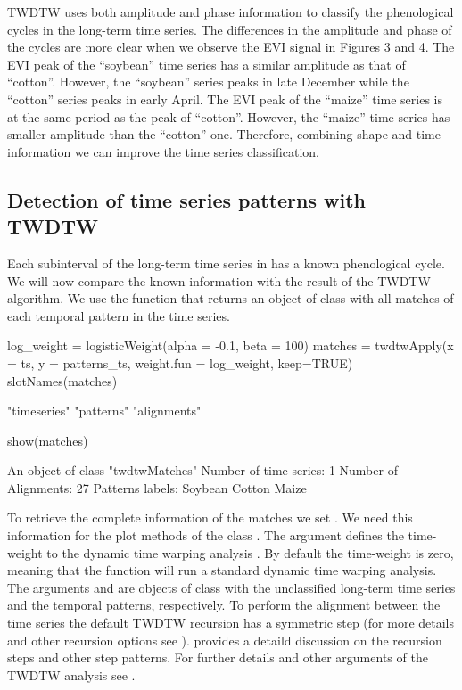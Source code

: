 \documentclass[article,shortnames]{jss}
\begin{document}
TWDTW uses both amplitude and phase information to classify the
phenological cycles in the long-term time series. The differences in the
amplitude and phase of the cycles are more clear when we observe the EVI
signal in Figures 3 and 4. The EVI peak of the ``soybean'' time series
has a similar amplitude as that of ``cotton''. However, the ``soybean''
series peaks in late December while the ``cotton'' series peaks in early
April. The EVI peak of the ``maize'' time series is at the same period
as the peak of ``cotton''. However, the ``maize'' time series has
smaller amplitude than the ``cotton'' one. Therefore, combining shape
and time information we can improve the time series classification.

\subsection{Detection of time series patterns with
TWDTW}\label{detection-of-time-series-patterns-with-twdtw}

Each subinterval of the long-term time series in  has a known
phenological cycle. We will now compare the known information with the
result of the TWDTW algorithm. We use the function 
that returns an  object of class  with
all matches of each temporal pattern in the time series.

\begin{CodeChunk}
\begin{CodeInput}
log_weight = logisticWeight(alpha = -0.1, beta = 100)
matches = 
  twdtwApply(x = ts, y = patterns_ts, weight.fun = log_weight, keep=TRUE)
slotNames(matches)
\end{CodeInput}
\begin{CodeOutput}
[1] "timeseries" "patterns"   "alignments"
\end{CodeOutput}
\begin{CodeInput}
show(matches)
\end{CodeInput}
\begin{CodeOutput}
An object of class "twdtwMatches"
Number of time series: 1 
Number of Alignments: 27 
Patterns labels: Soybean Cotton Maize 
\end{CodeOutput}
\end{CodeChunk}

To retrieve the complete information of the matches we set
. We need this information for the plot methods of the
class . The argument  defines the
time-weight to the dynamic time warping analysis \citep{Maus:2016}. By
default the time-weight is zero, meaning that the function will run a
standard dynamic time warping analysis. The arguments  and
 are objects of class  with the
unclassified long-term time series and the temporal patterns,
respectively. To perform the alignment between the time series the
default TWDTW recursion has a symmetric step (for more details and other
recursion options see ). \citet{Giorgino:2009}
provides a detaild discussion on the recursion steps and other step
patterns. For further details and other arguments of the TWDTW analysis
see .
\end{document}
